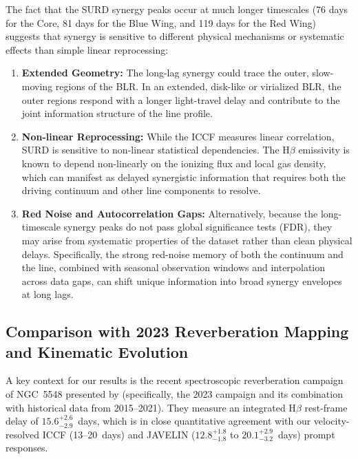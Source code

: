 \documentclass[fleqn,usenatbib]{mnras}
\begin{document}
The fact that the SURD synergy peaks occur at much longer timescales (76 days for the Core, 81 days for the Blue Wing, and 119 days for the Red Wing) suggests that synergy is sensitive to different physical mechanisms or systematic effects than simple linear reprocessing:
\begin{enumerate}
\item \textbf{Extended Geometry:} The long-lag synergy could trace the outer, slow-moving regions of the BLR. In an extended, disk-like or virialized BLR, the outer regions respond with a longer light-travel delay and contribute to the joint information structure of the line profile.
\item \textbf{Non-linear Reprocessing:} While the ICCF measures linear correlation, SURD is sensitive to non-linear statistical dependencies. The H\(\beta\) emissivity is known to depend non-linearly on the ionizing flux and local gas density, which can manifest as delayed synergistic information that requires both the driving continuum and other line components to resolve.
\item \textbf{Red Noise and Autocorrelation Gaps:} Alternatively, because the long-timescale synergy peaks do not pass global significance tests (FDR), they may arise from systematic properties of the dataset rather than clean physical delays. Specifically, the strong red-noise memory of both the continuum and the line, combined with seasonal observation windows and interpolation across data gaps, can shift unique information into broad synergy envelopes at long lags.
\end{enumerate}

\subsection{Comparison with 2023 Reverberation Mapping and Kinematic Evolution}
\label{sec:comparison_xi}

A key context for our results is the recent spectroscopic reverberation campaign of NGC~5548 presented by \textcite{LongDexter2025} (specifically, the 2023 campaign and its combination with historical data from 2015--2021). They measure an integrated H\(\beta\) rest-frame delay of \(15.6_{-2.9}^{+2.6}\)~days, which is in close quantitative agreement with our velocity-resolved ICCF (13--20~days) and JAVELIN (\(12.8_{-1.8}^{+1.8}\) to \(20.1_{-3.2}^{+2.9}\)~days) prompt responses. 
\end{document}
